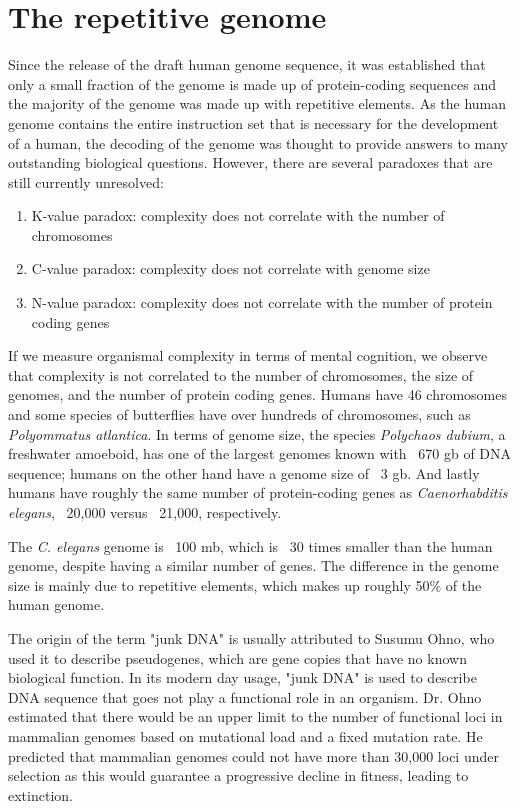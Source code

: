 \section{The repetitive genome}

Since the release of the draft human genome sequence\cite{venter2001sequence, lander2001initial}, it was established that only a small fraction of the genome is made up of protein-coding sequences and the majority of the genome was made up with repetitive elements. As the human genome contains the entire instruction set that is necessary for the development of a human, the decoding of the genome was thought to provide answers to many outstanding biological questions. However, there are several paradoxes that are still currently unresolved:

\begin{enumerate}
   \item K-value paradox: complexity does not correlate with the number of chromosomes
   \item C-value paradox: complexity does not correlate with genome size
   \item N-value paradox: complexity does not correlate with the number of protein coding genes
\end{enumerate}

If we measure organismal complexity in terms of mental cognition, we observe that complexity is not correlated to the number of chromosomes, the size of genomes, and the number of protein coding genes. Humans have 46 chromosomes and some species of butterflies have over hundreds of chromosomes, such as \textit{Polyommatus atlantica}. In terms of genome size, the species \textit{Polychaos dubium}, a freshwater amoeboid, has one of the largest genomes known with ~670 gb of DNA sequence; humans on the other hand have a genome size of ~3 gb. And lastly humans have roughly the same number of protein-coding genes as \textit{Caenorhabditis elegans}, ~20,000 versus ~21,000, respectively.


The \textit{C. elegans} genome is ~100 mb\cite{celegans1998sequencing}, which is ~30 times smaller than the human genome, despite having a similar number of genes. The difference in the genome size is mainly due to repetitive elements, which makes up roughly 50\% of the human genome.

The origin of the term "junk DNA" is usually attributed to Susumu Ohno, who used it to describe pseudogenes, which are gene copies that have no known biological function. In its modern day usage, "junk DNA" is used to describe DNA sequence that goes not play a functional role in an organism. Dr. Ohno estimated that there would be an upper limit to the number of functional loci in mammalian genomes based on mutational load and a fixed mutation rate. He predicted that mammalian genomes could not have more than 30,000 loci under selection as this would guarantee a progressive decline in fitness, leading to extinction.

